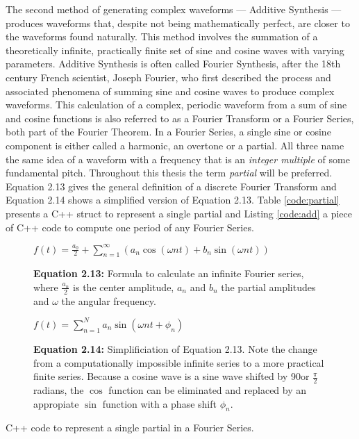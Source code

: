 The second method of generating complex waveforms --- Additive Synthesis --- produces waveforms that, despite not being mathematically perfect, are closer to the waveforms found naturally. This method involves the summation of a theoretically infinite, practically finite set of sine and cosine waves with varying parameters. Additive Synthesis is often called Fourier Synthesis, after the 18th century French scientist, Joseph Fourier, who first described the process and associated phenomena of summing sine and cosine waves to produce complex waveforms. This calculation of a complex, periodic waveform from a sum of sine and cosine functions is also referred to as a Fourier Transform or a Fourier Series, both part of the Fourier Theorem. In a Fourier Series, a single sine or cosine component is either called a harmonic, an overtone or a partial. All three name the same idea of a waveform with a frequency that is an \emph{integer multiple} of some fundamental pitch.  Throughout this thesis the term \emph{partial} will be preferred. Equation 2.13 gives the general definition of a discrete Fourier Transform and Equation 2.14 shows a simplified version of Equation 2.13. Table \ref{code:partial} presents a C++ struct to represent a single partial and Listing \ref{code:add} a piece of C++ code to compute one period of any Fourier Series.

\begin{figure}[h!]
  $f(t) = \frac{a_{0}}{2} + \sum\limits_{n=1}^\infty (a_{n} \cos(\omega n t) + b_{n} \sin(\omega n t))$
  \caption*{\textbf{Equation 2.13: }Formula to calculate an infinite Fourier series, where $\frac{a_{n}}{2}$ is the center amplitude, $a_{n}$ and $b_{n}$ the partial amplitudes and $\omega$ the angular frequency.}
  \label{fig:fourier1}
\end{figure}

\begin{figure}[h!]
  $f(t) = \sum\limits_{n=1}^N a_{n} \sin(\omega n t + \phi_{n})$
  \caption*{\textbf{Equation 2.14:} Simplificiation of Equation 2.13. Note the change from a computationally impossible infinite series to a more practical finite series. Because a cosine wave is a sine wave shifted by 90\degree or $\frac{\pi}{2}$ radians, the $\cos$ function can be eliminated and replaced by an appropiate $\sin$ function with a phase shift $\phi_{n}$.}
  \label{fig:fourier2}
\end{figure}

\begin{table}[h!]
  \caption{C++ code to represent a single partial in a Fourier Series.}
  \label{code:partial}
\end{table}

